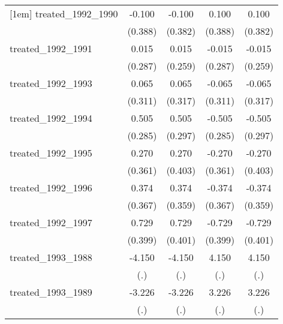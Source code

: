 {\begin{tabular}{l*{4}{c}}
[1em]
treated\_1992\_1990&      -0.100         &      -0.100         &       0.100         &       0.100         \\
            &     (0.388)         &     (0.382)         &     (0.388)         &     (0.382)         \\
[1em]
treated\_1992\_1991&       0.015         &       0.015         &      -0.015         &      -0.015         \\
            &     (0.287)         &     (0.259)         &     (0.287)         &     (0.259)         \\
[1em]
treated\_1992\_1993&       0.065         &       0.065         &      -0.065         &      -0.065         \\
            &     (0.311)         &     (0.317)         &     (0.311)         &     (0.317)         \\
[1em]
treated\_1992\_1994&       0.505         &       0.505         &      -0.505         &      -0.505         \\
            &     (0.285)         &     (0.297)         &     (0.285)         &     (0.297)         \\
[1em]
treated\_1992\_1995&       0.270         &       0.270         &      -0.270         &      -0.270         \\
            &     (0.361)         &     (0.403)         &     (0.361)         &     (0.403)         \\
[1em]
treated\_1992\_1996&       0.374         &       0.374         &      -0.374         &      -0.374         \\
            &     (0.367)         &     (0.359)         &     (0.367)         &     (0.359)         \\
[1em]
treated\_1992\_1997&       0.729         &       0.729         &      -0.729         &      -0.729         \\
            &     (0.399)         &     (0.401)         &     (0.399)         &     (0.401)         \\
[1em]
treated\_1993\_1988&      -4.150         &      -4.150         &       4.150         &       4.150         \\
            &         (.)         &         (.)         &         (.)         &         (.)         \\
[1em]
treated\_1993\_1989&      -3.226         &      -3.226         &       3.226         &       3.226         \\
            &         (.)         &         (.)         &         (.)         &         (.)         \\

\end{tabular}}
